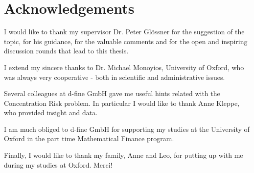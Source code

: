\chapter*{Acknowledgements} %
\label{cha:acknowledgements}


I would like to thank my supervisor Dr. Peter Gl\"ossner for the suggestion of the topic, for his guidance, for the valuable comments and for the open and inspiring discussion rounds that lead to this thesis.

I extend my sincere thanks to Dr. Michael Monoyios, University of Oxford, who was always very cooperative - both in scientific and administrative issues.

Several colleagues at d-fine GmbH gave me useful hints related with the Concentration Risk problem.
In particular I would like to thank Anne Kleppe, who provided insight and data.

I am much obliged to d-fine GmbH for supporting my studies at the University of Oxford in the part time Mathematical Finance program.

Finally, I would like to thank my family, Anne and Leo, for putting up with me during my studies at Oxford. Merci!


